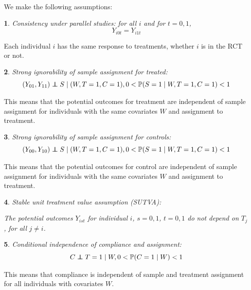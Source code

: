 \documentclass[12pt]{article}
\makeatletter
\newtheorem*{assumption*}{\assumptionnumber}
\providecommand{\assumptionnumber}{}
\newenvironment{assumption}[2]
 {%
  \renewcommand{\assumptionnumber}{Assumption #1}%
  \begin{assumption*}%
  \protected@edef\@currentlabel{#1}%
 }
 {%
  \end{assumption*}
 }
\newcommand{\pr}{\mathbb{P}} %
\newcommand\independent{\protect\mathpalette{\protect\independenT}{\perp}}
\def\independenT#1#2{\mathrel{\rlap{$#1#2$}\mkern2mu{#1#2}}}
\makeatother
\begin{document}
We make the following assumptions:
\begin{assumption}{1}{}\label{consistency}
Consistency under parallel studies: for all $i$ and for $t=0, 1$,
$$Y_{i0t} = Y_{i1t}$$
\end{assumption}

Each individual $i$ has the same response to treatments, whether $i$ is in the RCT or not.

\begin{assumption}{2}{}\label{si_treat}
Strong ignorability of sample assignment for treated:
\begin{equation*}
(Y_{01}, Y_{11}) \independent S \mid (W, T=1,C = 1), 0 < \pr(S=1 \mid W, T=1,C = 1) <1 
\end{equation*}
\end{assumption}
\noindent This means that the potential outcomes for treatment are independent of sample assignment for individuals with the same covariates $W$ and assignment to treatment.

\begin{assumption}{3}{}\label{si_ctrl}
Strong ignorability of sample assignment for controls:
\begin{equation*}
(Y_{00}, Y_{10}) \independent S \mid (W, T=1,C = 1), 0 < \pr(S=1 \mid W, T=1,C = 1) <1 
\end{equation*}\end{assumption}

\noindent This means that the potential outcomes for control are independent of sample assignment for individuals with the same covariates $W$ and assignment to treatment.

\begin{assumption}{4}{}\label{sutva}
Stable unit treatment value assumption (SUTVA):

The potential outcomes $Y_{ist}$ for individual $i$, $s = 0,1$, $t=0,1$ do not depend on $T_j$, for all $j\neq i$.
\end{assumption}
 
\begin{assumption}{5}{}\label{compl}
Conditional independence of compliance and assignment:
\begin{equation*}
C \independent T=1 \mid W, 0 < \pr(C = 1 \mid W) < 1
\end{equation*}
\end{assumption}
\noindent This means that compliance is independent of sample and treatment assignment for all individuals with covariates $W$.
\end{document}
